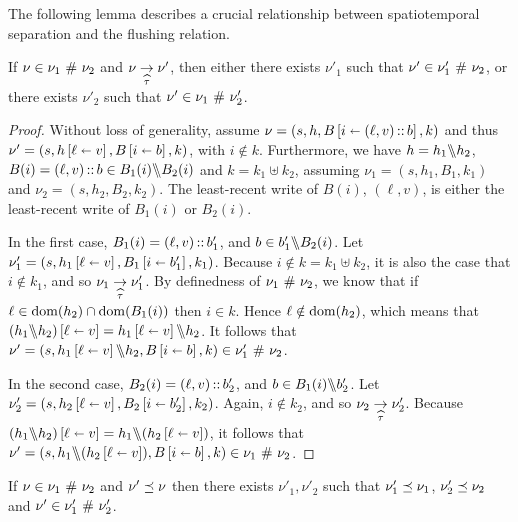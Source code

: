 \documentclass[11pt]{report}
\begin{document}
The following lemma describes a crucial relationship between spatiotemporal separation and the flushing relation. 

\begin{lemma}
  \label{lem:separation-tau}
  If $\nu \in \nu_1 \operatorname{\,\#\,} \nu_2$ and $\nu \underset{\widehat{\tau}}{\rightarrow} \nu'$, then either there exists $\nu'_1$ such that $\nu' \in \nu'_1 \operatorname{\,\#\,} \nu_2$, or there exists $\nu'_2$ such that $\nu' \in \nu_1 \operatorname{\,\#\,} \nu'_2$.
\end{lemma}

\begin{proof}
  Without loss of generality, assume $\nu = (s,h,B \left[ i \shortleftarrow (\ell,v)\operatorname{:\!:} b \right],k)$ and thus $\nu' = (s,h \left[ \ell \shortleftarrow v \right],B \left[ i \shortleftarrow b \right],k)$, with $i \notin k$. Furthermore, we have $h = h_1 \backslash\!\!\backslash h_2$, $B(i) = (\ell,v) \operatorname{:\!:} b \in B_1(i) \backslash\!\!\backslash B_2(i)$ and $k = k_1 \uplus k_2$, assuming $\nu_1 = (s,h_1,B_1,k_1)$ and $\nu_2 = (s,h_2,B_2,k_2)$. The least-recent write of $B(i)$, $(\ell,v)$, is either the least-recent write of $B_1(i)$ or $B_2(i)$. 

  In the first case, $B_1(i) = (\ell,v) \operatorname{:\!:} b_1'$, and $b \in b'_1 \backslash\!\!\backslash B_2(i)$. Let $\nu'_1 = (s,h_1 \left[ \ell \shortleftarrow v \right],B_1 \left[ i \shortleftarrow b'_1 \right],k_1)$. Because $i \notin k = k_1 \uplus k_2$, it is also the case that $i \notin k_1$, and so $\nu_1 \underset{\widehat{\tau}}{\rightarrow} \nu'_1$. By definedness of $\nu_1 \operatorname{\,\#\,} \nu_2$, we know that if $\ell \in \operatorname{\mathrm{dom}}(h_2) \cap \operatorname{\mathrm{dom}}(B_1(i))$ then $i \in k$. Hence $\ell \notin \operatorname{\mathrm{dom}}(h_2)$, which means that $(h_1 \backslash\!\!\backslash h_2) \left[ \ell \shortleftarrow v \right] = h_1 \left[ \ell \shortleftarrow v \right] \backslash\!\!\backslash h_2$. It follows that $\nu' = (s,h_1 \left[ \ell \shortleftarrow v \right] \backslash\!\!\backslash h_2, B \left[ i \shortleftarrow b \right],k) \in \nu'_1 \operatorname{\,\#\,} \nu_2$. 

  In the second case, $B_2(i) = (\ell,v) \operatorname{:\!:} b'_2$, and $b \in B_1(i) \backslash\!\!\backslash b'_2$. Let $\nu'_2 = (s,h_2 \left[ \ell \shortleftarrow v \right],B_2 \left[ i \shortleftarrow b'_2 \right],k_2)$. Again, $i \notin k_2$, and so $\nu_2 \underset{\widehat{\tau}}{\rightarrow} \nu'_2$. Because $(h_1 \backslash\!\!\backslash h_2) \left[ \ell \shortleftarrow v \right] = h_1 \backslash\!\!\backslash (h_2 \left[ \ell \shortleftarrow v \right])$, it follows that $\nu' = (s,h_1 \backslash\!\!\backslash (h_2 \left[ \ell \shortleftarrow v \right]),B \left[ i \shortleftarrow b \right],k) \in \nu_1 \operatorname{\,\#\,} \nu_2$. 
\end{proof}

\begin{lemma}
  \label{lem:separation-refinement}
  If $\nu \in \nu_1 \operatorname{\,\#\,} \nu_2$ and $\nu' \preceq \nu$ then there exists $\nu'_1,\nu'_2$ such that $\nu'_1 \preceq \nu_1$, $\nu'_2 \preceq \nu_2$ and $\nu' \in \nu'_1 \operatorname{\,\#\,} \nu'_2$. 
\end{lemma}
\end{document}
